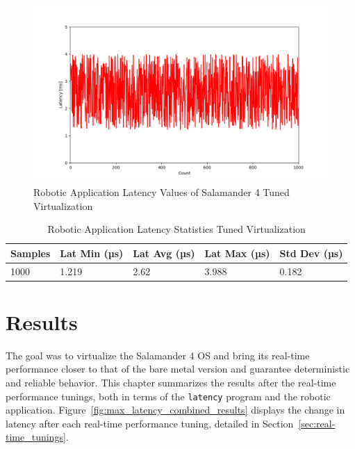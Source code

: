 \documentclass[MMR,Master,english]{style/twbook}
\begin{document}
\begin{figure}[H]
	\centering
	\includegraphics[width=1.0\columnwidth]{img/implementation/tuned_virt_latencies.png}
	\caption[Robotic Application Latency Values of Salamander 4 Tuned Virtualization]{Robotic Application Latency Values of Salamander 4 Tuned Virtualization}
	\label{fig:tuned_virt_latencies}
\end{figure}
\begin{table}[H]
	\centering
	\caption{Robotic Application Latency Statistics Tuned Virtualization}
	\label{tab:robotic_application_latency_values_virt_tun}
	\setlength{\tabcolsep}{0.5em} %
	{\renewcommand{\arraystretch}{1.2}%
		\begin{tabular}{|l|l|l|l|l|}
			\hline
			\textbf{Samples} & \textbf{Lat Min (µs)} & \textbf{Lat Avg (µs)} & \textbf{Lat Max (µs)} & \textbf{Std Dev (µs)} \\ \hline
			1000             & 1.219                 & 2.62                  & 3.988                 & 0.182                 \\ \hline
		\end{tabular}}
\end{table}

\clearpage

\chapter{Results}\label{cha:results}
The goal was to virtualize the Salamander 4 OS and bring its real-time performance closer to that of the bare metal version and guarantee deterministic and reliable behavior. This chapter summarizes the results after the real-time performance tunings, both in terms of the \texttt{latency} program and the robotic application. Figure~\ref{fig:max_latency_combined_results} displays the change in latency after each real-time performance tuning, detailed in Section~\ref{sec:real-time_tunings}.
\end{document}
